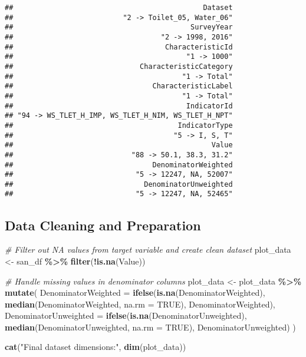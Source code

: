 \documentclass[
]{article}
\newenvironment{Shaded}{\begin{snugshade}}{\end{snugshade}}
\newcommand{\AttributeTok}[1]{\textcolor[rgb]{0.13,0.29,0.53}{#1}}
\newcommand{\CommentTok}[1]{\textcolor[rgb]{0.56,0.35,0.01}{\textit{#1}}}
\newcommand{\ConstantTok}[1]{\textcolor[rgb]{0.56,0.35,0.01}{#1}}
\newcommand{\FunctionTok}[1]{\textcolor[rgb]{0.13,0.29,0.53}{\textbf{#1}}}
\newcommand{\NormalTok}[1]{#1}
\newcommand{\OtherTok}[1]{\textcolor[rgb]{0.56,0.35,0.01}{#1}}
\newcommand{\SpecialCharTok}[1]{\textcolor[rgb]{0.81,0.36,0.00}{\textbf{#1}}}
\newcommand{\StringTok}[1]{\textcolor[rgb]{0.31,0.60,0.02}{#1}}
\begin{document}
\begin{verbatim}
##                                             Dataset 
##                          "2 -> Toilet_05, Water_06" 
##                                          SurveyYear 
##                                   "2 -> 1998, 2016" 
##                                    CharacteristicId 
##                                         "1 -> 1000" 
##                              CharacteristicCategory 
##                                        "1 -> Total" 
##                                 CharacteristicLabel 
##                                        "1 -> Total" 
##                                         IndicatorId 
## "94 -> WS_TLET_H_IMP, WS_TLET_H_NIM, WS_TLET_H_NPT" 
##                                       IndicatorType 
##                                      "5 -> I, S, T" 
##                                               Value 
##                            "88 -> 50.1, 38.3, 31.2" 
##                                 DenominatorWeighted 
##                             "5 -> 12247, NA, 52007" 
##                               DenominatorUnweighted 
##                             "5 -> 12247, NA, 52465"
\end{verbatim}

\subsection{Data Cleaning and
Preparation}\label{data-cleaning-and-preparation}

\begin{Shaded}
\begin{Highlighting}[]
\CommentTok{\# Filter out NA values from target variable and create clean dataset}
\NormalTok{plot\_data }\OtherTok{\textless{}{-}}\NormalTok{ san\_df }\SpecialCharTok{\%\textgreater{}\%} \FunctionTok{filter}\NormalTok{(}\SpecialCharTok{!}\FunctionTok{is.na}\NormalTok{(Value))}

\CommentTok{\# Handle missing values in denominator columns}
\NormalTok{plot\_data }\OtherTok{\textless{}{-}}\NormalTok{ plot\_data }\SpecialCharTok{\%\textgreater{}\%}
  \FunctionTok{mutate}\NormalTok{(}
    \AttributeTok{DenominatorWeighted =} \FunctionTok{ifelse}\NormalTok{(}\FunctionTok{is.na}\NormalTok{(DenominatorWeighted),}
                                \FunctionTok{median}\NormalTok{(DenominatorWeighted, }\AttributeTok{na.rm =} \ConstantTok{TRUE}\NormalTok{),}
\NormalTok{                                DenominatorWeighted),}
    \AttributeTok{DenominatorUnweighted =} \FunctionTok{ifelse}\NormalTok{(}\FunctionTok{is.na}\NormalTok{(DenominatorUnweighted),}
                                  \FunctionTok{median}\NormalTok{(DenominatorUnweighted, }\AttributeTok{na.rm =} \ConstantTok{TRUE}\NormalTok{),}
\NormalTok{                                  DenominatorUnweighted)}
\NormalTok{  )}

\FunctionTok{cat}\NormalTok{(}\StringTok{"Final dataset dimensions:"}\NormalTok{, }\FunctionTok{dim}\NormalTok{(plot\_data))}
\end{Highlighting}
\end{Shaded}
\end{document}
